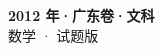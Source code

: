 \documentclass[zihao=-4, a4paper]{ctexart}
\begin{document}
\begin{center}
  {\Large\bfseries 2012 年·广东卷·文科}\\[4pt]
  {\large 数学 · 试题版}
\end{center}
\medskip
{}

\end{document}
